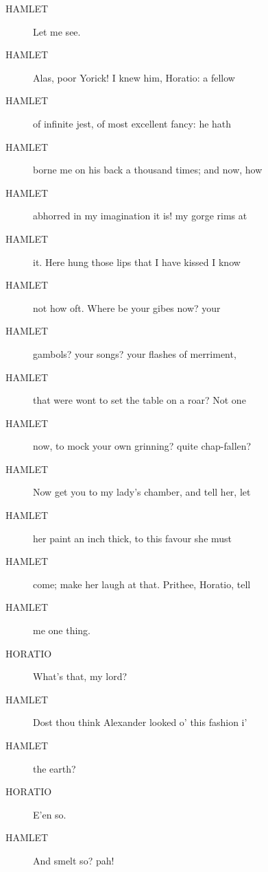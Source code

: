 \documentclass{article}
\begin{document}
\begin{description}
            
\item[HAMLET] Let me see.
\item[HAMLET] Alas, poor Yorick! I knew him, Horatio: a fellow
\item[HAMLET] of infinite jest, of most excellent fancy: he hath
\item[HAMLET] borne me on his back a thousand times; and now, how
\item[HAMLET] abhorred in my imagination it is! my gorge rims at
\item[HAMLET] it. Here hung those lips that I have kissed I know
\item[HAMLET] not how oft. Where be your gibes now? your
\item[HAMLET] gambols? your songs? your flashes of merriment,
\item[HAMLET] that were wont to set the table on a roar? Not one
\item[HAMLET] now, to mock your own grinning? quite chap-fallen?
\item[HAMLET] Now get you to my lady's chamber, and tell her, let
\item[HAMLET] her paint an inch thick, to this favour she must
\item[HAMLET] come; make her laugh at that. Prithee, Horatio, tell
\item[HAMLET] me one thing.
\end{description}
          
\begin{description}
            
\item[HORATIO] What's that, my lord?
\end{description}
          
\begin{description}
            
\item[HAMLET] Dost thou think Alexander looked o' this fashion i'
\item[HAMLET] the earth?
\end{description}
          
\begin{description}
            
\item[HORATIO] E'en so.
\end{description}
          
\begin{description}
            
\item[HAMLET] And smelt so? pah!
\end{description}
          
\end{document}
